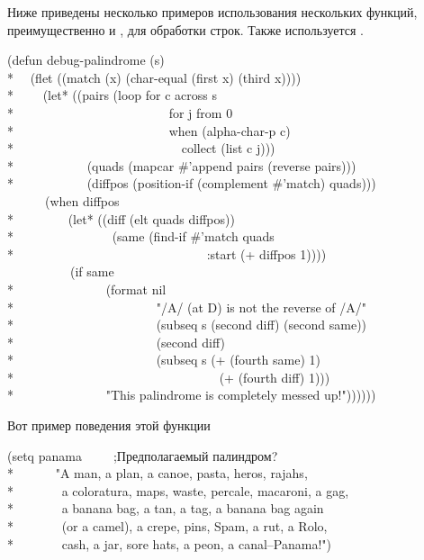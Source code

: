 Ниже приведены несколько примеров использования нескольких функций,
преимущественно  и , для обработки строк.
Также используется .
\begin{lisp}
(defun debug-palindrome (s) \\*
~~(flet ((match (x) (char-equal (first x) (third x)))) \\*
~~~~(let* ((pairs (loop for c across s \\*
~~~~~~~~~~~~~~~~~~~~~~~~for j from 0 \\*
~~~~~~~~~~~~~~~~~~~~~~~~when (alpha-char-p c) \\*
~~~~~~~~~~~~~~~~~~~~~~~~~~collect (list c j))) \\*
~~~~~~~~~~~(quads (mapcar \#'append pairs (reverse pairs))) \\*
~~~~~~~~~~~(diffpos (position-if (complement \#'match) quads))) \\
~~~~~~(when diffpos \\*
~~~~~~~~(let* ((diff (elt quads diffpos)) \\*
~~~~~~~~~~~~~~~(same (find-if \#'match quads \\*
~~~~~~~~~~~~~~~~~~~~~~~~~~~~~~:start (+ diffpos 1)))) \\
~~~~~~~~~~(if same \\*
~~~~~~~~~~~~~~(format nil \\*
~~~~~~~~~~~~~~~~~~~~~~"/{\Xtilde}A/ (at {\Xtilde}D) is not the reverse of /{\Xtilde}A/" \\*
~~~~~~~~~~~~~~~~~~~~~~(subseq s (second diff) (second same)) \\*
~~~~~~~~~~~~~~~~~~~~~~(second diff) \\*
~~~~~~~~~~~~~~~~~~~~~~(subseq s (+ (fourth same) 1) \\*
~~~~~~~~~~~~~~~~~~~~~~~~~~~~~~~~(+ (fourth diff) 1))) \\*
~~~~~~~~~~~~~~"This palindrome is completely messed up!"))))))
\end{lisp}
Вот пример поведения этой функции
\begin{lisp}
(setq panama~~~~~;\textrm{Предполагаемый палиндром?} \\*
~~~~~~"A man, a plan, a canoe, pasta, heros, rajahs, \\*
~~~~~~~a coloratura, maps, waste, percale, macaroni, a gag, \\*
~~~~~~~a banana bag, a tan, a tag, a banana bag again \\*
~~~~~~~(or a camel), a crepe, pins, Spam, a rut, a Rolo, \\*
~~~~~~~cash, a jar, sore hats, a peon, a canal--Panama!")
\end{lisp}
